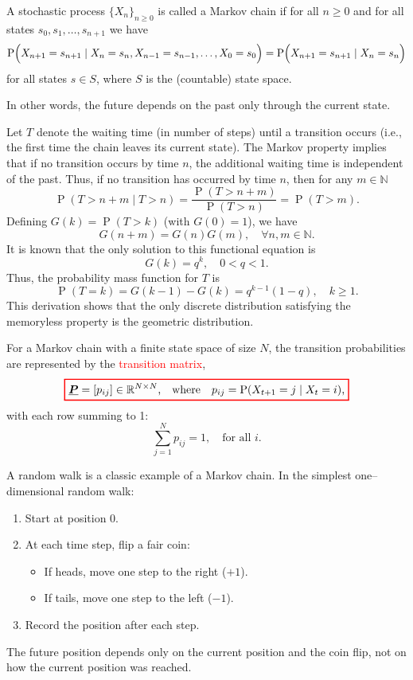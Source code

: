 \documentclass[10pt, headings=standardclasses, parskip=half, twoside]{scrartcl}
\renewcommand{\emph}[1]{\textcolor{mypurple}{#1}}
\newcommand{\matr}[1]{\underline{\boldsymbol{#1}}}
\newcommand{\R}{\mathbb{R}}
\newcommand{\N}{\mathbb{N}}
\newcommand{\Prob}{\operatorname{P}}
\begin{document}
\begin{definition}\label{def:markov}
A stochastic process \(\{X_n\}_{n\ge0}\) is called a \emph{Markov chain} if for all \(n\ge0\) and for all states \(s_0,s_1,\ldots,s_{n+1}\) we have
\[
\Prob\Bigl(X_{n+1}=s_{n+1}\mid X_n=s_n, X_{n-1}=s_{n-1},\ldots,X_0=s_0\Bigr)=\Prob\Bigl(X_{n+1}=s_{n+1}\mid X_n=s_n\Bigr)
\]
for all states \(s \in S\), where \(S\) is the (countable) state space.
\end{definition}
In other words, the future depends on the past only through the current state.

Let \(T\) denote the waiting time (in number of steps) until a transition occurs (i.e., the first time the chain leaves its current state). The Markov property implies that if no transition occurs by time \(n\), the additional waiting time is independent of the past. Thus, if no transition has occurred by time \(n\), then for any \(m\in\N\)
\[
\Prob(T>n+m\mid T>n)=\frac{\Prob(T>n+m)}{\Prob(T>n)}=\Prob(T>m).
\]
Defining \(G(k)=\Prob(T>k)\) (with \(G(0)=1\)), we have
\[
G(n+m)=G(n)G(m),\quad \forall n,m\in\N.
\]
It is known that the only solution to this functional equation is
\[
G(k)=q^k,\quad 0<q<1.
\]
Thus, the probability mass function for \(T\) is
\[
\Prob(T=k)=G(k-1)-G(k)=q^{k-1}(1-q),\quad k\ge 1.
\]
This derivation shows that the only discrete distribution satisfying the memoryless property is the geometric distribution.

For a Markov chain with a finite state space of size \(N\), the transition probabilities are represented by the \textcolor{red}{transition matrix},
\[
  {\color{red}
  \setlength{\fboxrule}{1pt}
  \boxed{ 
  \color{black}
  \matr{P}=[p_{ij}] \in \R^{N \times N} \text{,} \quad \text{where} \quad p_{ij}=\Prob(X_{t+1}=j\mid X_t=i)\text{,}
  }
  }
\]
with each row summing to 1:
\[
\sum_{j=1}^{N} p_{ij}=1,\quad \text{for all } i.
\]

\begin{example}\label{ex:randomwalk}
A random walk is a classic example of a Markov chain. In the simplest one–dimensional random walk:
\begin{enumerate}[before={\parskip = 0em}, nosep]
  \item Start at position 0.
  \item At each time step, flip a fair coin:
  \begin{itemize}[before={\parskip = 0em}, nosep]
    \item If heads, move one step to the right (\(+1\)).
    \item If tails, move one step to the left (\(-1\)).
  \end{itemize}
  \item Record the position after each step.
\end{enumerate}
The future position depends only on the current position and the coin flip, not on how the current position was reached.
\end{example}
\end{document}
